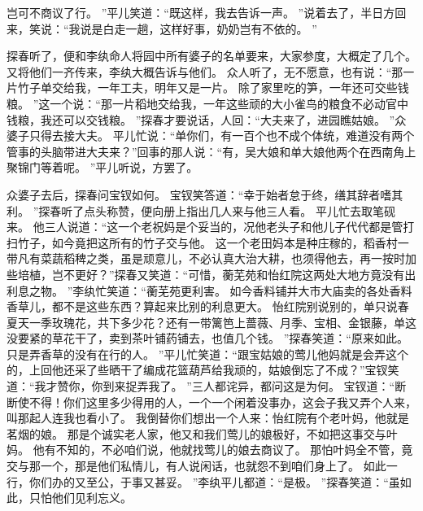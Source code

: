 岂可不商议了行。
”平儿笑道：“既这样，我去告诉一声。
”说着去了，半日方回来，笑说：“我说是白走一趟，这样好事，奶奶岂有不依的。
”\par
探春听了，便和李纨命人将园中所有婆子的名单要来，大家参度，大概定了几个。
又将他们一齐传来，李纨大概告诉与他们。
众人听了，无不愿意，也有说：“那一片竹子单交给我，一年工夫，明年又是一片。
除了家里吃的笋，一年还可交些钱粮。
”这一个说：“那一片稻地交给我，一年这些顽的大小雀鸟的粮食不必动官中钱粮，我还可以交钱粮。
”探春才要说话，人回：“大夫来了，进园瞧姑娘。
”众婆子只得去接大夫。
平儿忙说：“单你们，有一百个也不成个体统，难道没有两个管事的头脑带进大夫来？”回事的那人说：“有，吴大娘和单大娘他两个在西南角上聚锦门等着呢。
”平儿听说，方罢了。
\par
众婆子去后，探春问宝钗如何。
宝钗笑答道：“幸于始者怠于终，缮其辞者嗜其利。
”探春听了点头称赞，便向册上指出几人来与他三人看。
平儿忙去取笔砚来。
他三人说道：“这一个老祝妈是个妥当的，况他老头子和他儿子代代都是管打扫竹子，如今竟把这所有的竹子交与他。
这一个老田妈本是种庄稼的，稻香村一带凡有菜蔬稻稗之类，虽是顽意儿，不必认真大治大耕，也须得他去，再一按时加些培植，岂不更好？”探春又笑道：“可惜，蘅芜苑和怡红院这两处大地方竟没有出利息之物。
”李纨忙笑道：“蘅芜苑更利害。
如今香料铺并大市大庙卖的各处香料香草儿，都不是这些东西？算起来比别的利息更大。
怡红院别说别的，单只说春夏天一季玫瑰花，共下多少花？还有一带篱笆上蔷薇、月季、宝相、金银藤，单这没要紧的草花干了，卖到茶叶铺药铺去，也值几个钱。
”探春笑道：“原来如此。
只是弄香草的没有在行的人。
”平儿忙笑道：“跟宝姑娘的莺儿他妈就是会弄这个的，上回他还采了些晒干了编成花篮葫芦给我顽的，姑娘倒忘了不成？”宝钗笑道：“我才赞你，你到来捉弄我了。
”三人都诧异，都问这是为何。
宝钗道：“断断使不得！你们这里多少得用的人，一个一个闲着没事办，这会子我又弄个人来，叫那起人连我也看小了。
我倒替你们想出一个人来：怡红院有个老叶妈，他就是茗烟的娘。
那是个诚实老人家，他又和我们莺儿的娘极好，不如把这事交与叶妈。
他有不知的，不必咱们说，他就找莺儿的娘去商议了。
那怕叶妈全不管，竟交与那一个，那是他们私情儿，有人说闲话，也就怨不到咱们身上了。
如此一行，你们办的又至公，于事又甚妥。
”李纨平儿都道：“是极。
”探春笑道：“虽如此，只怕他们见利忘义。
